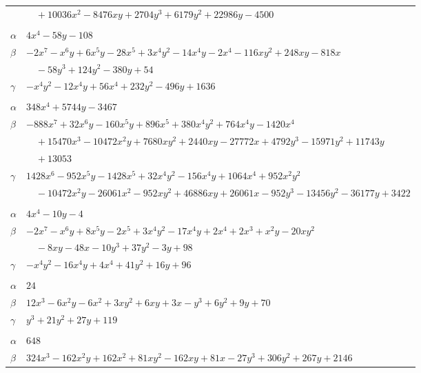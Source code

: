 \documentclass[11pt]{article}
\begin{document}
\begin{longtable}{@{}ll@{}}
 & $\quad +10036x^{2}-8476xy+2704y^{3}+6179y^{2}+22986y-4500$\\
\addlinespace[3pt]
\multicolumn{2}{@{}l}{$\{i,j\}=\{10,28\}$, $k_{ij}=2^{2}\cdot 5\cdot 13^{2}$}\\
$\alpha$ & $4x^{4}-58y-108$\\
$\beta$ & $-2x^{7}-x^{6}y+6x^{5}y-28x^{5}+3x^{4}y^{2}-14x^{4}y-2x^{4}-116xy^{2}+248xy-818x$\\
 & $\quad -58y^{3}+124y^{2}-380y+54$\\
$\gamma$ & $-x^{4}y^{2}-12x^{4}y+56x^{4}+232y^{2}-496y+1636$\\
\addlinespace[3pt]
\multicolumn{2}{@{}l}{$\{i,j\}=\{10,29\}$, $k_{ij}=3^{2}\cdot 5$}\\
$\alpha$ & $348x^{4}+5744y-3467$\\
$\beta$ & $-888x^{7}+32x^{6}y-160x^{5}y+896x^{5}+380x^{4}y^{2}+764x^{4}y-1420x^{4}$\\
 & $\quad +15470x^{3}-10472x^{2}y+7680xy^{2}+2440xy-27772x+4792y^{3}-15971y^{2}+11743y$\\
 & $\quad +13053$\\
$\gamma$ & $1428x^{6}-952x^{5}y-1428x^{5}+32x^{4}y^{2}-156x^{4}y+1064x^{4}+952x^{2}y^{2}$\\
 & $\quad -10472x^{2}y-26061x^{2}-952xy^{2}+46886xy+26061x-952y^{3}-13456y^{2}-36177y+3422$\\
\addlinespace[3pt]
\multicolumn{2}{@{}l}{$\{i,j\}=\{10,36\}$, $k_{ij}=2^{2}\cdot 5^{2}$}\\
$\alpha$ & $4x^{4}-10y-4$\\
$\beta$ & $-2x^{7}-x^{6}y+8x^{5}y-2x^{5}+3x^{4}y^{2}-17x^{4}y+2x^{4}+2x^{3}+x^{2}y-20xy^{2}$\\
 & $\quad -8xy-48x-10y^{3}+37y^{2}-3y+98$\\
$\gamma$ & $-x^{4}y^{2}-16x^{4}y+4x^{4}+41y^{2}+16y+96$\\
\addlinespace[3pt]
\multicolumn{2}{@{}l}{$\{i,j\}=\{11,15\}$, $k_{ij}=2^{4}\cdot 3^{2}$}\\
$\alpha$ & $24$\\
$\beta$ & $12x^{3}-6x^{2}y-6x^{2}+3xy^{2}+6xy+3x-y^{3}+6y^{2}+9y+70$\\
$\gamma$ & $y^{3}+21y^{2}+27y+119$\\
\addlinespace[3pt]
\multicolumn{2}{@{}l}{$\{i,j\}=\{12,15\}$, $k_{ij}=2^{4}\cdot 7^{2}\cdot 11$}\\
$\alpha$ & $648$\\
$\beta$ & $324x^{3}-162x^{2}y+162x^{2}+81xy^{2}-162xy+81x-27y^{3}+306y^{2}+267y+2146$\\

\end{longtable}
\end{document}
